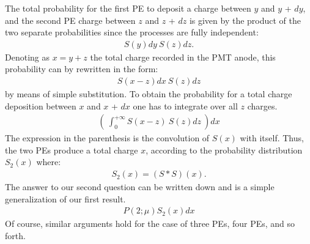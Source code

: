 \documentclass[a4paper,11pt]{article}
\begin{document}
The total probability for the first PE to deposit a charge between $y$ and $y$ + $dy$, 
and the second PE charge between $z$ and $z$ + $dz$ is given by the product of the two separate  probabilities since the processes are fully independent: 
\begin{align}
S(y)dy \ S(z)dz.
\end{align}
Denoting as $x = y+z$ the total charge recorded in the PMT anode, this probability can by rewritten in the form: 
\begin{align}
S(x-z) dx \ S(z)dz
\end{align}
by means of simple substitution. 
To obtain the probability for a total charge deposition between $x$ and $x$ + $dx$ one has to integrate over all $z$ charges. 
\begin{align}
\left( \ \int_{0}^{+\infty} S(x-z) \ S(z)dz \ \right) dx 
\end{align}
The expression in the parenthesis is the convolution of $S(x)$ with itself. %
Thus, the two PEs produce a total charge $x$, according to the probability distribution $S_2(x)$ where:
\begin{align}
S_2(x) = (S * S )(x).
\end{align}
The answer to our second question can be written down and is a simple generalization of our first result.
\begin{align}
P(2;\mu) S_2(x) dx 
\end{align}
Of course, similar arguments hold for the case of three PEs, four PEs, and so forth. 
\end{document}
